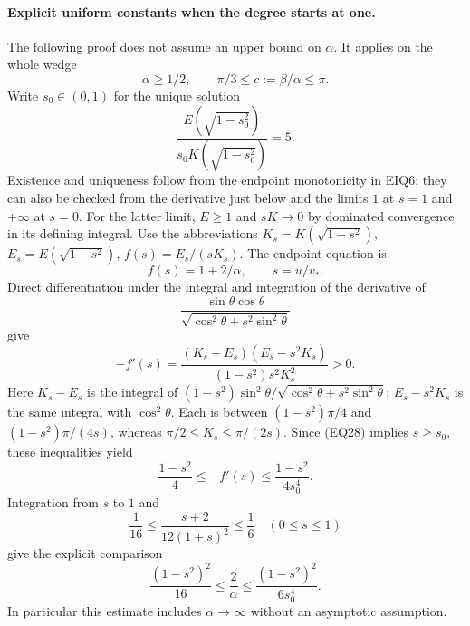 \documentclass[11pt,a4paper]{article}
\begin{document}
\paragraph{Explicit uniform constants when the degree starts at one.}
The following proof does not assume an upper bound on \(\alpha\).
It applies on the whole wedge
\[
 \alpha\ge1/2,\qquad \pi/3\le c:=\beta/\alpha\le\pi.
\tag{EQ28}
\]
Write \(s_0\in(0,1)\) for the unique solution
\[
 \frac{E(\sqrt{1-s_0^2})}
      {s_0K(\sqrt{1-s_0^2})}=5.
\tag{EQ29}
\]
Existence and uniqueness follow from the endpoint monotonicity in
EIQ6; they can also be checked from the derivative just below and the
limits \(1\) at \(s=1\) and \(+\infty\) at \(s=0\).
For the latter limit, \(E\ge1\) and
\(sK\to0\) by dominated convergence in its defining integral.
Use the abbreviations
\(K_s=K(\sqrt{1-s^2})\), \(E_s=E(\sqrt{1-s^2})\), \(f(s)=E_s/(sK_s)\).
The endpoint equation is
\[
 f(s)=1+2/\alpha,\qquad s=u/v_*.
\]
Direct differentiation under the integral and integration of the derivative
of
\[
\frac{\sin\theta\cos\theta}{\sqrt{\cos^2\theta+s^2\sin^2\theta}}
\]
give
\[
 -f'(s)=
 \frac{(K_s-E_s)(E_s-s^2K_s)}
      {(1-s^2)s^2K_s^2}>0.
\tag{EQ30}
\]
Here \(K_s-E_s\) is the integral of
\((1-s^2)\sin^2\theta/
\sqrt{\cos^2\theta+s^2\sin^2\theta}\);
\(E_s-s^2K_s\) is the same integral with \(\cos^2\theta\).
Each is between \((1-s^2)\pi/4\) and
\((1-s^2)\pi/(4s)\), whereas
\(\pi/2\le K_s\le\pi/(2s)\).
Since (EQ28) implies \(s\ge s_0\), these inequalities yield
\[
 \frac{1-s^2}{4}\le-f'(s)
       \le\frac{1-s^2}{4s_0^4}.
\]
Integration from \(s\) to \(1\) and
\[
 \frac1{16}\le\frac{s+2}{12(1+s)^2}\le\frac16
       \quad(0\le s\le1)
\]
give the explicit comparison
\[
 \frac{(1-s^2)^2}{16}\le\frac2\alpha
       \le\frac{(1-s^2)^2}{6s_0^4}.
\tag{EQ31}
\]
In particular this estimate includes \(\alpha\to\infty\) without
an asymptotic assumption.
\end{document}

